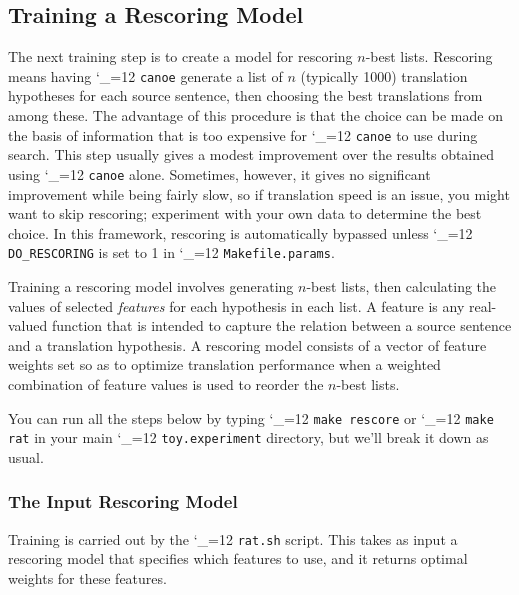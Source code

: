 \documentclass[11pt,letterpaper]{article}
\def\code{\begingroup\catcode`\_=12 \codex}
\newcommand{\codex}[1]{\texttt{#1}\endgroup}
\begin{document}
\subsection{Training a Rescoring Model} \label{RAT}

The next training step is to create a model for rescoring $n$-best
lists. Rescoring means having \code{canoe} generate a list of $n$ (typically
1000) translation hypotheses for each source sentence, then choosing the best
translations from among these. The advantage of this procedure is that the
choice can be made on the basis of information that is too expensive for
\code{canoe} to use during search. This step usually gives a modest
improvement over the results obtained using \code{canoe} alone. Sometimes,
however, it gives no significant improvement while being fairly slow, so if
translation speed is an issue, you might want to skip rescoring; experiment
with your own data to determine the best choice.  In this framework, rescoring
is automatically bypassed unless \code{DO_RESCORING} is set to 1 in
\code{Makefile.params}.

Training a rescoring model involves generating $n$-best lists, then calculating
the values of selected \emph{features} for each hypothesis in each list. A
feature is any real-valued function that is intended to capture the relation
between a source sentence and a translation hypothesis. A rescoring model
consists of a vector of feature weights set so as to optimize translation
performance when a weighted combination of feature values is used to reorder
the $n$-best lists.

You can run all the steps below by typing \code{make rescore} or
\code{make rat} in your main \code{toy.experiment} directory, but we'll break
it down as usual.

\subsubsection{The Input Rescoring Model}

Training is carried out by the \code{rat.sh} script. This takes as input a
rescoring model that specifies which features to use, and it returns optimal
weights for these features.
\end{document}
